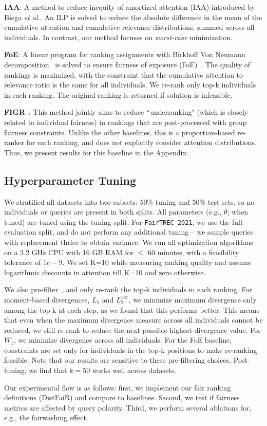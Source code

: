 \textbf{IAA}: A method to reduce inequity of amortized attention (IAA) introduced by Biega \emph{et al.}\cite{biega2018equity}. An ILP is solved to reduce the absolute difference in the mean of the cumulative attention and cumulative relevance distributions, summed across all individuals. In contrast, our method focuses on \emph{worst-case} minimization.

\textbf{FoE}: A linear program for ranking assignments with Birkhoff Von Neumann decomposition~\cite{lewandowski1986algorithmic} is solved to ensure fairness of exposure (FoE)~\cite{singh2018fairness}. The quality of rankings is maximized, with the constraint that the cumulative attention to relevance ratio is the same for all individuals. We re-rank only top-k individuals in each ranking. The original ranking is returned if solution is infeasible.


\textbf{FIGR}~\cite{gorantla2021problem}: This method jointly aims to reduce ``underranking" (which is closely related to individual fairness) in rankings that are post-processed with group fairness constraints. Unlike the other baselines, this is a proportion-based re-ranker for each ranking, and does not explicitly consider attention distributions. Thus, we present results for this baseline in the Appendix. 

\vspace{-0.5em}
\subsection{Hyperparameter Tuning}
We stratified all datasets into two subsets: 50\% tuning and 50\% test sets, so no individuals or queries are present in both splits. All parameters (e.g., $\theta$; when tuned) are tuned using the tuning split. For \texttt{FairTREC 2021}, we use the full evaluation split, and do not perform any additional tuning -- we sample queries with replacement thrice to obtain variance. We run all optimization algorithms on a 3.2 GHz CPU with 16 GB RAM for $\leq$ 60 minutes, with a feasibility tolerance of $1e-9$. We set K=10 while measuring ranking quality and assume logarithmic discounts in attention till K=10 and zero otherwise.

We also pre-filter~\cite{biega2018equity}, and only re-rank the top-k individuals in each ranking. For moment-based divergences, $L_1$ and $L_2^{var}$,  we minimize maximum divergence only among the top-k at each step, as we found that this performs better. This means that even when the maximum divergence measure across all individuals cannot be reduced, we still re-rank to reduce the next possible highest divergence value. For $W_1$, we minimize divergence across all individuals. For the FoE baseline, constraints are set only for individuals in the top-k positions to make re-ranking feasible. Note that our results are sensitive to these pre-filtering choices. Post-tuning, we find that $k=50$ works well across datasets.

Our experimental flow is as follows: first, we implement our fair ranking definitions (DistFaiR) and compare to baselines. Second, we test if fairness metrics are affected by query polarity. Third, we perform several ablations for, e.g., the fairwashing effect.

